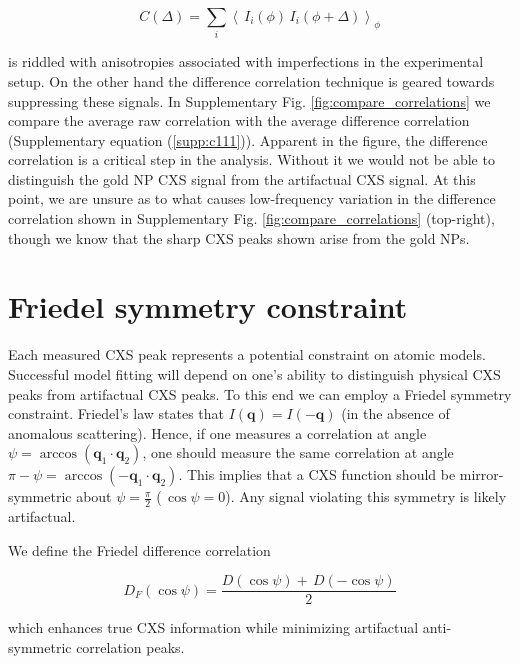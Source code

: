 \documentclass [12pt,fleqn]{article}
\def \be {\begin{equation}}
\def \ee {\end{equation}}
\begin{document}
\be
C(\Delta) = \sum_i  \left \langle \,I_{i}( \phi) \,I_{i}(\phi +\Delta) \right \rangle _\phi
\ee

is riddled with anisotropies associated with imperfections in the experimental setup. On the other hand the difference correlation technique is geared towards suppressing these signals. In  Supplementary Fig. \ref{fig:compare_correlations} we compare the average raw correlation with the average difference correlation (Supplementary equation (\ref{supp:c111})). Apparent in the figure, the difference correlation is a critical step in the analysis. Without it we would not be able to distinguish the gold NP CXS signal from the artifactual CXS signal. At this point, we are unsure as to what causes low-frequency variation in the difference correlation shown in Supplementary Fig. \ref{fig:compare_correlations} (top-right), though we know that the sharp CXS peaks shown arise from the gold NPs.

\section{Friedel symmetry constraint} \label{supp:Friedel}
Each measured CXS peak represents a potential constraint on atomic models. Successful model fitting will depend on one's ability to distinguish physical CXS peaks from artifactual CXS peaks. To this end we can employ a Friedel symmetry constraint. Friedel's law \cite{friedel1913symetries} states that $I(\bm q) = I(-\bm q)$ (in the absence of anomalous scattering). Hence, if one measures a correlation at angle $\psi = \arccos ( \bm q_1 \cdot \bm q_2)$, one should measure the same correlation at angle $\pi - \psi = \arccos( -\bm q_1 \cdot \bm q_2)$. This implies that a CXS function should be mirror-symmetric about $\psi = \frac{\pi}{2}$ ($\,\cos \psi=0$). Any signal violating this symmetry is likely artifactual. 

We define the Friedel difference correlation

\be
D_F(\cos \psi) = \frac{D(\cos \psi)  +\, D(-\cos \psi)}{2} 
\ee

which enhances true CXS information while minimizing artifactual anti-symmetric correlation peaks. %

\end{document}
